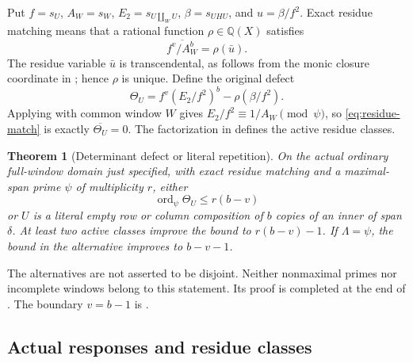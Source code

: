 \documentclass[11pt,a4paper]{amsart}
\numberwithin{equation}{section}
\theoremstyle{plain}
\newtheorem{theorem}{Theorem}[section]
\theoremstyle{definition}
\begin{document}
Put \(f=s_U\), \(A_W=s_W\), \(E_2=s_{U\amalg_WU}\), \(\beta=s_{UHU}\), and \(u=\beta/f^2\).  Exact residue matching means that a rational function \(\rho\in\mathbb Q(X)\) satisfies
\begin{equation}\label{eq:residue-match}
 \overline{f^v/A_W^b}=\rho(\bar u).
\end{equation}
The residue variable \(\bar u\) is transcendental, as follows from the monic closure coordinate in ; hence \(\rho\) is unique.  Define the original defect
\begin{equation}\label{eq:original-defect}
 \Theta_U=f^v(E_2/f^2)^b-\rho(\beta/f^2).
\end{equation}
Applying  with common window \(W\) gives \(E_2/f^2\equiv1/A_W\pmod\psi\), so \eqref{eq:residue-match} is exactly \(\overline{\Theta_U}=0\).  The factorization in  defines the active residue classes.

\begin{theorem}[Determinant defect or literal repetition]\label{thm:intrinsic-order}
On the actual ordinary full-window domain just specified, with exact residue matching and a maximal-span prime \(\psi\) of multiplicity \(r\), either
\[
 \operatorname{ord}_\psi\Theta_U\le r(b-v)
\]
or \(U\) is a literal empty row or column composition of \(b\) copies of an inner of span \(\delta\).  At least two active classes improve the bound to \(r(b-v)-1\).  If \(\Lambda=\psi\), the bound in the alternative improves to \(b-v-1\).
\end{theorem}

The alternatives are not asserted to be disjoint.  Neither nonmaximal primes nor incomplete windows belong to this statement.  Its proof is completed at the end of .  The boundary \(v=b-1\) is .

\subsection{Actual responses and residue classes}
\end{document}
